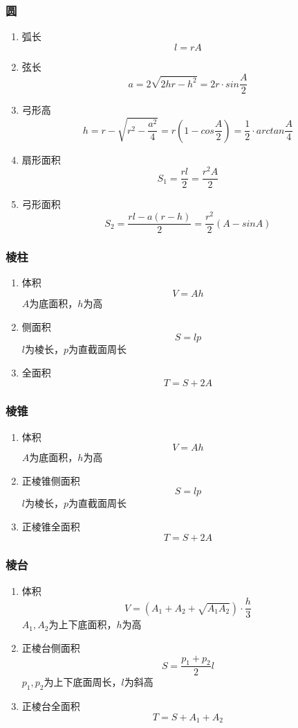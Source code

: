 \documentclass[a4paper]{article}
\begin{document}
\subsubsection{圆}

\begin{enumerate}
	\item 弧长
		$$l=rA$$
	\item 弦长
		$$a=2\sqrt{2hr-h^2}=2r\cdot sin\frac{A}{2}$$
	\item 弓形高
		$$h=r-\sqrt{r^2-\frac{a^2}{4}}=r(1-cos\frac{A}{2})=\frac{1}{2} \cdot arctan\frac{A}{4}$$
	\item 扇形面积
		$$S_1=\frac{rl}{2}=\frac{r^2A}{2}$$
	\item 弓形面积
		$$S_2=\frac{rl-a(r-h)}{2}=\frac{r^2}{2}(A-sinA)$$
\end{enumerate}

\subsubsection{棱柱}

\begin{enumerate}
	\item 体积
		$$V=Ah$$
		$A$为底面积，$h$为高
	\item 侧面积
		$$S=lp$$
		$l$为棱长，$p$为直截面周长
	\item 全面积
		$$T=S+2A$$
\end{enumerate}

\subsubsection{棱锥}

\begin{enumerate}
	\item 体积
		$$V=Ah$$
		$A$为底面积，$h$为高
	\item 正棱锥侧面积
		$$S=lp$$
		$l$为棱长，$p$为直截面周长
	\item 正棱锥全面积
		$$T=S+2A$$
\end{enumerate}

\subsubsection{棱台}

\begin{enumerate}
	\item 体积
		$$V=(A_1+A_2+\sqrt{A_1A_2}) \cdot \frac{h}{3}$$
		$A_1,A_2$为上下底面积，$h$为高
	\item 正棱台侧面积
		$$S=\frac{p_1+p_2}{2}l$$
		$p_1,p_2$为上下底面周长，$l$为斜高
	\item 正棱台全面积
		$$T=S+A_1+A_2$$
\end{enumerate}
\end{document}

